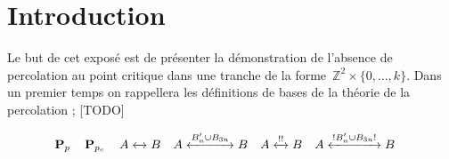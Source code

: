 		\chapter*{Introduction}
		Le but de cet exposé est de présenter la démonstration de l'absence de percolation au point critique dans une tranche de la forme~$\mathbb{Z}^2\times\{0,...,k\}$. Dans un premier temps on rappellera les définitions de bases de la théorie de la percolation ; [TODO]
		
		\[
			\Pp								\quad
			\Pp[p_c]						\quad
			\relie{A}{B}					\quad
			\relie[B_n'\cup B_{3n}]{A}{B}	\quad
			\relie*{A}{B}					\quad
			\relie*[B_n'\cup B_{3n}]{A}{B}	\quad
		\]
		
		\Tbreak
